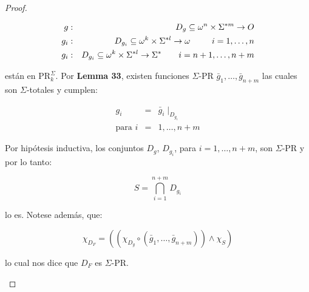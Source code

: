 \begin{proof}
\begin{enumerate}
        \begin{eqnarray*}
          g &:& D_{g} \subseteq \omega^{n} \times \Sigma^{\ast m} \rightarrow O \\
          g_{i} &:& D_{g_{i}} \subseteq \omega^{k} \times \Sigma^{\ast l} \rightarrow \omega \qquad \;\; i = 1, \dotsc,
            n \\
          g_{i} &:& D_{g_{i}} \subseteq \omega^{k} \times \Sigma^{\ast l} \rightarrow \Sigma^{\ast} \qquad i = n + 1, \dotsc,
            n + m
        \end{eqnarray*}

        \PN están en $\mathrm{PR}_{k}^{\Sigma}$. Por \textbf{Lemma 33}, existen funciones $\Sigma$-PR $\bar{g}_{1},
        \dotsc, \bar{g}_{n+m}$ las cuales son $\Sigma$-totales y cumplen:

        \begin{eqnarray*}
          g_{i} &=& \bar{g}_{i} \mid_{D_{g_{i}}} \\
          \text{para } i &=& 1, \dotsc, n + m
        \end{eqnarray*}

        \PN Por hipótesis inductiva, los conjuntos $D_{g}$, $D_{g_{i}}$, para $i = 1, \dotsc, n + m$, son $\Sigma$-PR y
        por lo tanto:

        \[
          S = \bigcap_{i=1}^{n+m} D_{g_{i}}
        \]

        \PN lo es. Notese además, que:

        \[
          \chi_{D_{F}} = \left((\chi_{D_{g}} \circ (\bar{g}_{1}, \dotsc, \bar{g}_{n+m})) \wedge \chi_{S}\right)
        \]

        \PN lo cual nos dice que $D_{F}$ es $\Sigma$-PR.
    \end{enumerate}
  \end{proof}
